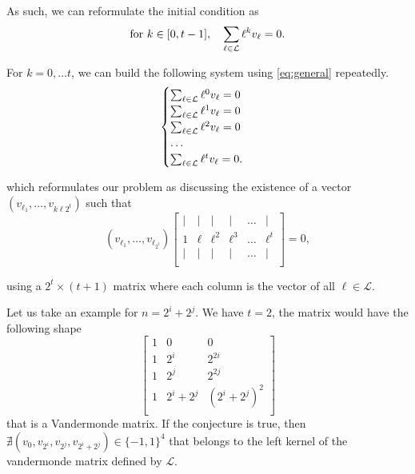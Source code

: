 As such, we can reformulate the initial condition as
\begin{equation}\label{eq:general}
    \text{for } k \in [0, t-1], \quad \sum_{\ell \in \mathcal{L}} \ell^kv_\ell = 0.
\end{equation}

For $k = 0, \ldots t$, we can build the following system using \cref{eq:general} repeatedly.
\begin{equation}
    \begin{cases}
        \sum_{\ell \in \mathcal{L}} \ell^0v_\ell = 0\\
        \sum_{\ell \in \mathcal{L}} \ell^1v_\ell = 0\\
        \sum_{\ell \in \mathcal{L}} \ell^2v_\ell = 0\\
        \ldots\\
        \sum_{\ell \in \mathcal{L}} \ell^tv_\ell = 0.\\
    \end{cases}
\end{equation}

which reformulates our problem as discussing the existence of a vector $(v_{\ell_1}, \ldots, v_{k\ell{2^t}})$ such that
$$
(v_{\ell_1}, \ldots, v_{\ell_{2^t}})
\begin{bmatrix}
    | & | & | & | & \ldots & |\\
    1 & \ell & \ell^2 & \ell^3 & \ldots & \ell^t\\
    | & | & | & | & \ldots & |\\
\end{bmatrix} = 0,
$$

using a  $2^t \times (t + 1)$ matrix where each column is the vector of all $\ell \in \mathcal{L}$.

Let us take an example for $n = 2^i + 2^j$. We have $t = 2$, the matrix would have the following shape
$$
\begin{bmatrix}
    1 & 0 & 0\\
    1 & 2^i & 2^{2i}\\
    1 & 2^j & 2^{2j}\\
    1 & 2^i + 2^j & (2^i + 2^j)^2\\
\end{bmatrix}
$$
that is a Vandermonde matrix. If the conjecture is true, then $\nexists (v_0, v_{2^i}, v_{2^j}, v_{2^i + 2^j}) \in \{-1, 1\}^4$ that belongs to the left kernel of the vandermonde matrix defined by $\mathcal{L}$.


